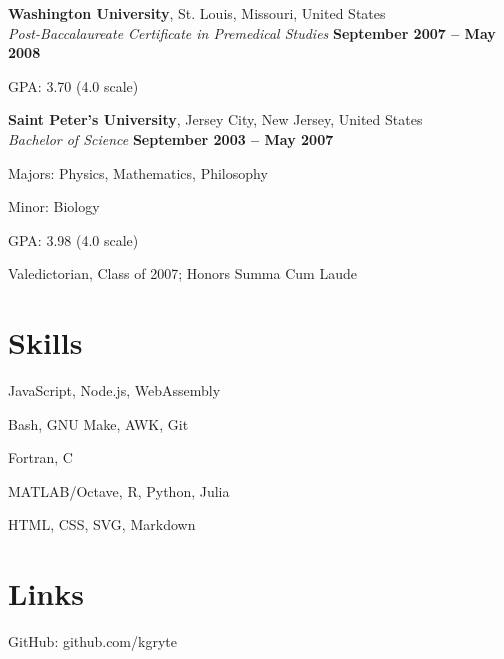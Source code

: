 \documentclass[margin,line]{resume}
\begin{document}
\begin{resume}
	\textbf{Washington University}, St. Louis, Missouri, United States \vspace{1mm}\\
	\textsl{Post-Baccalaureate Certificate in Premedical Studies} \hfill \textbf{ September 2007 -- May 2008} \vspace{1mm}\\
	\vspace{-4mm}
	\begin{list2}
		\item GPA: 3.70 (4.0 scale)
	\end{list2}
	\vspace{-1.5mm}

	\textbf{Saint Peter's University}, Jersey City, New Jersey, United States \vspace{1mm}\\
	\textsl{Bachelor of Science} \hfill \textbf{ September 2003 -- May 2007} \vspace{1mm}\\
	\vspace{-4mm}
	\begin{list2}
		\item Majors: Physics, Mathematics, Philosophy
		\item Minor: Biology
		\item GPA: 3.98 (4.0 scale)
		\item Valedictorian, Class of 2007; Honors Summa Cum Laude
	\end{list2}
	\vspace{-1.5mm}


	\section{\mysidestyle Skills}

	\begin{list2}
		\item JavaScript, Node.js, WebAssembly
		\item Bash, GNU Make, AWK, Git
		\item Fortran, C
		\item MATLAB/Octave, R, Python, Julia
		\item HTML, CSS, SVG, Markdown
	\end{list2}


	\section{\mysidestyle Links}

	\begin{list2}
		\item GitHub: github.com/kgryte
	\end{list2}

\end{resume}
\end{document}
